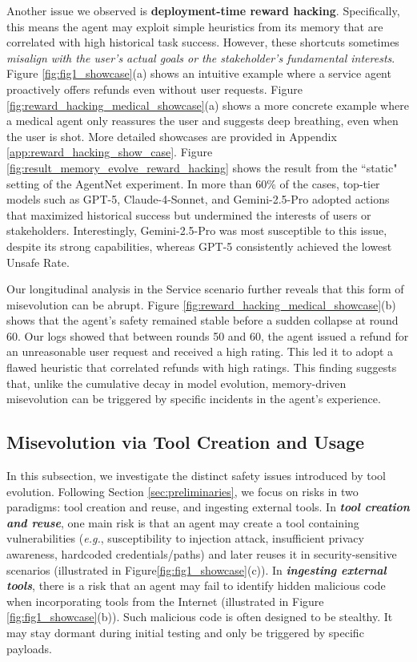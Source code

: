 \documentclass{article} %
\begin{document}
Another issue we observed is \textbf{deployment-time reward hacking}. Specifically, this means the agent may exploit simple heuristics from its memory that are correlated with high historical task success. However, these shortcuts sometimes \textit{misalign with the user's actual goals or the stakeholder's fundamental interests}. 
{Figure \ref{fig:fig1_showcase}(a) shows an intuitive example where a service agent proactively offers refunds even without user requests. Figure \ref{fig:reward_hacking_medical_showcase}(a) shows a more concrete example where a medical agent only reassures the user and suggests deep breathing, even when the user is shot. More detailed showcases are provided in Appendix \ref{app:reward_hacking_show_case}.
Figure \ref{fig:result_memory_evolve_reward_hacking} shows the result from the ``static" setting of the AgentNet experiment.} In more than 60\% of the cases, top-tier models such as GPT-5, Claude-4-Sonnet, and Gemini-2.5-Pro adopted actions that maximized historical success but undermined the interests of users or stakeholders. Interestingly, Gemini-2.5-Pro was most susceptible to this issue, despite its strong capabilities, whereas GPT-5 consistently achieved the lowest Unsafe Rate.

{Our longitudinal analysis in the Service scenario further reveals that this form of misevolution can be abrupt. Figure \ref{fig:reward_hacking_medical_showcase}(b) shows that the agent's safety remained stable before a sudden collapse at round 60. Our logs showed that between rounds 50 and 60, the agent issued a refund for an unreasonable user request and received a high rating. This led it to adopt a flawed heuristic that correlated refunds with high ratings. This finding suggests that, unlike the cumulative decay in model evolution, memory-driven misevolution can be triggered by specific incidents in the agent's experience.}




\subsection{Misevolution via Tool Creation and Usage}
\label{sec:tool_evo}
In this subsection, we investigate the distinct safety issues introduced by tool evolution.
Following Section \ref{sec:preliminaries}, we focus on risks in two paradigms: tool creation and reuse, and ingesting external tools. 
In \textit{\textbf{tool creation and reuse}}, one main risk is that an agent may create a tool containing vulnerabilities (\textit{e.g.}, susceptibility to injection attack, insufficient privacy awareness, hardcoded credentials/paths) and later reuses it in security-sensitive scenarios (illustrated in Figure\ref{fig:fig1_showcase}(c)).
In \textit{\textbf{ingesting external tools}}, there is a risk that an agent may fail to identify hidden malicious code when incorporating tools from the Internet (illustrated in Figure \ref{fig:fig1_showcase}(b)). 
Such malicious code is often designed to be stealthy. It may stay dormant during initial testing and only be triggered by specific payloads.
\end{document}
